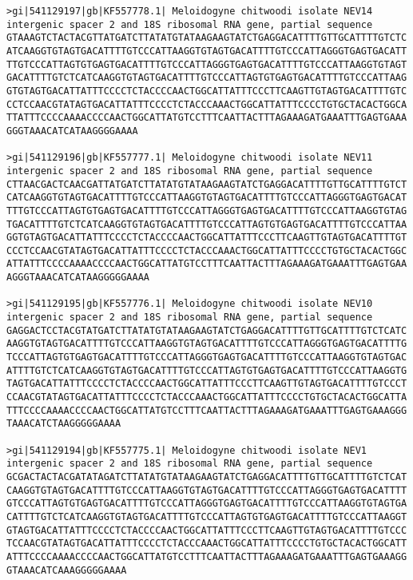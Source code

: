 \documentclass[11pt]{article}
\begin{document}
\begin{Verbatim}[commandchars=\\\{\}]
>gi|541129197|gb|KF557778.1| Meloidogyne chitwoodi isolate NEV14 intergenic spacer 2 and 18S ribosomal RNA gene, partial sequence
GTAAAGTCTACTACGTTATGATCTTATATGTATAAGAAGTATCTGAGGACATTTTGTTGCATTTTGTCTC
ATCAAGGTGTAGTGACATTTTGTCCCATTAAGGTGTAGTGACATTTTGTCCCATTAGGGTGAGTGACATT
TTGTCCCATTAGTGTGAGTGACATTTTGTCCCATTAGGGTGAGTGACATTTTGTCCCATTAAGGTGTAGT
GACATTTTGTCTCATCAAGGTGTAGTGACATTTTGTCCCATTAGTGTGAGTGACATTTTGTCCCATTAAG
GTGTAGTGACATTATTTCCCCTCTACCCCAACTGGCATTATTTCCCTTCAAGTTGTAGTGACATTTTGTC
CCTCCAACGTATAGTGACATTATTTCCCCTCTACCCAAACTGGCATTATTTCCCCTGTGCTACACTGGCA
TTATTTCCCCAAAACCCCAACTGGCATTATGTCCTTTCAATTACTTTAGAAAGATGAAATTTGAGTGAAA
GGGTAAACATCATAAGGGGAAAA

>gi|541129196|gb|KF557777.1| Meloidogyne chitwoodi isolate NEV11 intergenic spacer 2 and 18S ribosomal RNA gene, partial sequence
CTTAACGACTCAACGATTATGATCTTATATGTATAAGAAGTATCTGAGGACATTTTGTTGCATTTTGTCT
CATCAAGGTGTAGTGACATTTTGTCCCATTAAGGTGTAGTGACATTTTGTCCCATTAGGGTGAGTGACAT
TTTGTCCCATTAGTGTGAGTGACATTTTGTCCCATTAGGGTGAGTGACATTTTGTCCCATTAAGGTGTAG
TGACATTTTGTCTCATCAAGGTGTAGTGACATTTTGTCCCATTAGTGTGAGTGACATTTTGTCCCATTAA
GGTGTAGTGACATTATTTCCCCTCTACCCCAACTGGCATTATTTCCCTTCAAGTTGTAGTGACATTTTGT
CCCTCCAACGTATAGTGACATTATTTCCCCTCTACCCAAACTGGCATTATTTCCCCTGTGCTACACTGGC
ATTATTTCCCCAAAACCCCAACTGGCATTATGTCCTTTCAATTACTTTAGAAAGATGAAATTTGAGTGAA
AGGGTAAACATCATAAGGGGGAAAA

>gi|541129195|gb|KF557776.1| Meloidogyne chitwoodi isolate NEV10 intergenic spacer 2 and 18S ribosomal RNA gene, partial sequence
GAGGACTCCTACGTATGATCTTATATGTATAAGAAGTATCTGAGGACATTTTGTTGCATTTTGTCTCATC
AAGGTGTAGTGACATTTTGTCCCATTAAGGTGTAGTGACATTTTGTCCCATTAGGGTGAGTGACATTTTG
TCCCATTAGTGTGAGTGACATTTTGTCCCATTAGGGTGAGTGACATTTTGTCCCATTAAGGTGTAGTGAC
ATTTTGTCTCATCAAGGTGTAGTGACATTTTGTCCCATTAGTGTGAGTGACATTTTGTCCCATTAAGGTG
TAGTGACATTATTTCCCCTCTACCCCAACTGGCATTATTTCCCTTCAAGTTGTAGTGACATTTTGTCCCT
CCAACGTATAGTGACATTATTTCCCCTCTACCCAAACTGGCATTATTTCCCCTGTGCTACACTGGCATTA
TTTCCCCAAAACCCCAACTGGCATTATGTCCTTTCAATTACTTTAGAAAGATGAAATTTGAGTGAAAGGG
TAAACATCTAAGGGGGAAAA

>gi|541129194|gb|KF557775.1| Meloidogyne chitwoodi isolate NEV1 intergenic spacer 2 and 18S ribosomal RNA gene, partial sequence
GCGACTACTACGATATAGATCTTATATGTATAAGAAGTATCTGAGGACATTTTGTTGCATTTTGTCTCAT
CAAGGTGTAGTGACATTTTGTCCCATTAAGGTGTAGTGACATTTTGTCCCATTAGGGTGAGTGACATTTT
GTCCCATTAGTGTGAGTGACATTTTGTCCCATTAGGGTGAGTGACATTTTGTCCCATTAAGGTGTAGTGA
CATTTTGTCTCATCAAGGTGTAGTGACATTTTGTCCCATTAGTGTGAGTGACATTTTGTCCCATTAAGGT
GTAGTGACATTATTTCCCCTCTACCCCAACTGGCATTATTTCCCTTCAAGTTGTAGTGACATTTTGTCCC
TCCAACGTATAGTGACATTATTTCCCCTCTACCCAAACTGGCATTATTTCCCCTGTGCTACACTGGCATT
ATTTCCCCAAAACCCCAACTGGCATTATGTCCTTTCAATTACTTTAGAAAGATGAAATTTGAGTGAAAGG
GTAAACATCAAAGGGGGAAAA


\end{Verbatim}
\end{document}
